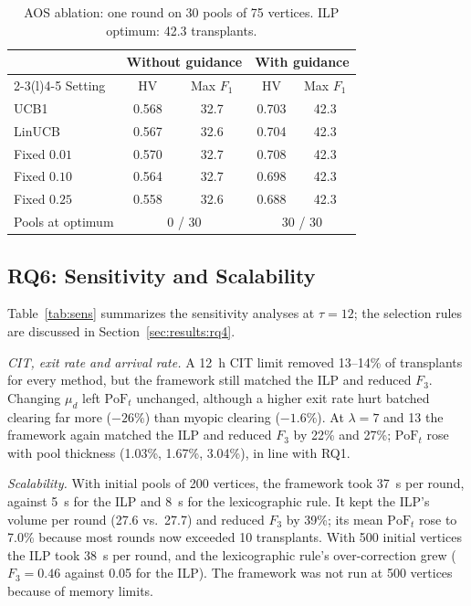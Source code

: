 \documentclass[journal]{IEEEtran}
\newcommand{\pof}{\ensuremath{\mathrm{PoF}_t}}
\begin{document}
\begin{table}[!t]
\centering
\caption{AOS ablation: one round on 30 pools of 75 vertices.
ILP optimum: 42.3 transplants.}
\label{tab:ablation}
\footnotesize
\setlength{\tabcolsep}{3pt}
\begin{tabular}{@{}lcccc@{}}
\toprule
& \multicolumn{2}{c}{Without guidance} & \multicolumn{2}{c}{With guidance} \\
\cmidrule(lr){2-3}\cmidrule(l){4-5}
Setting & HV & Max $F_1$ & HV & Max $F_1$ \\
\midrule
UCB1          & 0.568 & 32.7 & 0.703 & 42.3 \\
LinUCB        & 0.567 & 32.6 & 0.704 & 42.3 \\
Fixed $0.01$  & 0.570 & 32.7 & 0.708 & 42.3 \\
Fixed $0.10$  & 0.564 & 32.7 & 0.698 & 42.3 \\
Fixed $0.25$  & 0.558 & 32.6 & 0.688 & 42.3 \\
\midrule
Pools at optimum & \multicolumn{2}{c}{0 / 30} & \multicolumn{2}{c}{30 / 30} \\
\bottomrule
\end{tabular}
\end{table}

\subsection{RQ6: Sensitivity and Scalability}
\label{sec:results:rq6}

Table~\ref{tab:sens} summarizes the sensitivity analyses at
$\tau = 12$; the selection rules are discussed in
Section~\ref{sec:results:rq4}.

\emph{CIT, exit rate and arrival rate.} A 12~h CIT limit removed
13--14\% of transplants for every method, but the framework still
matched the ILP and reduced $F_3$. Changing $\mu_d$ left $\pof$
unchanged, although a higher exit rate hurt batched clearing far more
($-26\%$) than myopic clearing ($-1.6\%$). At $\lambda = 7$ and 13 the
framework again matched the ILP and reduced $F_3$ by 22\% and 27\%;
$\pof$ rose with pool thickness (1.03\%, 1.67\%, 3.04\%), in line with
RQ1.

\emph{Scalability.} With initial pools of 200 vertices, the framework
took 37~s per round, against 5~s for the ILP and 8~s for the
lexicographic rule. It kept the ILP's volume per round (27.6 vs.\
27.7) and reduced $F_3$ by 39\%; its mean $\pof$ rose to 7.0\%
because most rounds now exceeded 10 transplants. With 500 initial
vertices the ILP took 38~s per round, and the lexicographic rule's
over-correction grew ($F_3 = 0.46$ against 0.05 for the ILP). The
framework was not run at 500 vertices because of memory limits.
\end{document}
